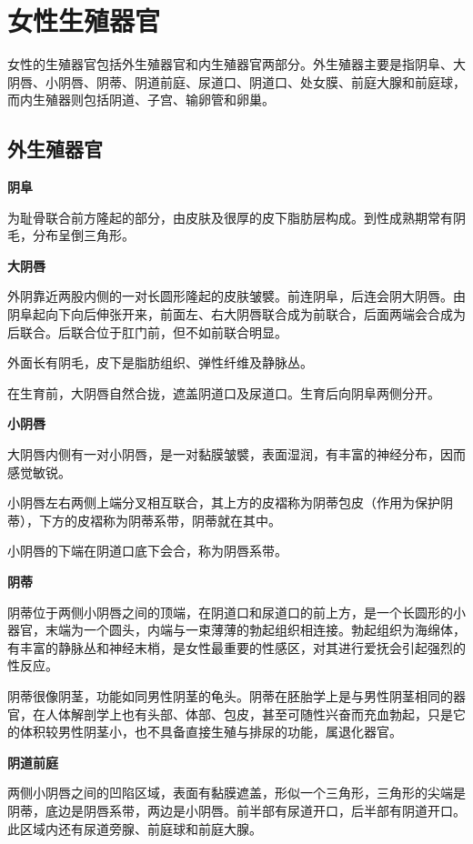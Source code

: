 \documentclass[12pt,UTF8]{ctexbook}
\begin{document}
\chapter{女性生殖器官}

女性的生殖器官包括外生殖器官和内生殖器官两部分。外生殖器主要是指阴阜、大阴唇、小阴唇、阴蒂、阴道前庭、尿道口、阴道口、处女膜、前庭大腺和前庭球，而内生殖器则包括阴道、子宫、输卵管和卵巢。

\section{外生殖器官}

\textbf{阴阜}

为耻骨联合前方隆起的部分，由皮肤及很厚的皮下脂肪层构成。到性成熟期常有阴毛，分布呈倒三角形。

\textbf{大阴唇}

外阴靠近两股内侧的一对长圆形隆起的皮肤皱襞。前连阴阜，后连会阴大阴唇。由阴阜起向下向后伸张开来，前面左、右大阴唇联合成为前联合，后面两端会合成为后联合。后联合位于肛门前，但不如前联合明显。

外面长有阴毛，皮下是脂肪组织、弹性纤维及静脉丛。

在生育前，大阴唇自然合拢，遮盖阴道口及尿道口。生育后向阴阜两侧分开。

\textbf{小阴唇}

大阴唇内侧有一对小阴唇，是一对黏膜皱襞，表面湿润，有丰富的神经分布，因而感觉敏锐。

小阴唇左右两侧上端分叉相互联合，其上方的皮褶称为阴蒂包皮（作用为保护阴蒂），下方的皮褶称为阴蒂系带，阴蒂就在其中。

小阴唇的下端在阴道口底下会合，称为阴唇系带。

\textbf{阴蒂}

阴蒂位于两侧小阴唇之间的顶端，在阴道口和尿道口的前上方，是一个长圆形的小器官，末端为一个圆头，内端与一束薄薄的勃起组织相连接。勃起组织为海绵体，有丰富的静脉丛和神经末梢，是女性最重要的性感区，对其进行爱抚会引起强烈的性反应。

阴蒂很像阴茎，功能如同男性阴茎的龟头。阴蒂在胚胎学上是与男性阴茎相同的器官，在人体解剖学上也有头部、体部、包皮，甚至可随性兴奋而充血勃起，只是它的体积较男性阴茎小，也不具备直接生殖与排尿的功能，属退化器官。

\textbf{阴道前庭}

两侧小阴唇之间的凹陷区域，表面有黏膜遮盖，形似一个三角形，三角形的尖端是阴蒂，底边是阴唇系带，两边是小阴唇。前半部有尿道开口，后半部有阴道开口。此区域内还有尿道旁腺、前庭球和前庭大腺。
\end{document}
